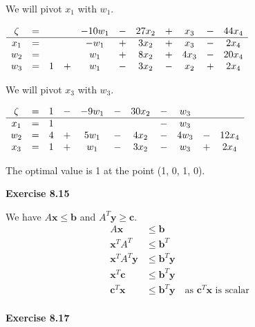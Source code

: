 \documentclass[letterpaper,12pt]{article}
\newcommand{\vect}[1]{\mathbf{#1}}
\begin{document}
We will pivot $x_1$ with $w_1$.

\begin{center}
	$\begin{array}{ c c c c c c c c c c c c}
	\zeta & = & & & -10w_1 & - & 27x_2 & + & x_3 & - & 44x_4 \\
	\hline
	x_1 & = &  & & -w_1 & + & 3x_2 & + & x_3 & - & 2x_4 \\
	w_2 & = &  & & w_1 & + & 8x_2 & + & 4x_3 & - & 20x_4 \\
	w_3 & = & 1 & + & w_1 & - & 3x_2 & - & x_2 & + & 2x_4 \\
	\end{array}$ \\
\end{center}

We will pivot $x_3$ with $w_3$.

\begin{center}
	$\begin{array}{ c c c c c c c c c c c c}
	\zeta & = & 1 & - & -9w_1 & - & 30x_2 & - & w_3 & & \\
	\hline
	x_1 & = & 1 & & & & & - & w_3 & & \\
	w_2 & = & 4 & + & 5w_1 & - & 4x_2 & - & 4w_3 & - & 12x_4 \\
	x_3 & = & 1 & + & w_1 & - & 3x_2 & - & w_3 & + & 2x_4 \\
	\end{array}$ \\
\end{center}

The optimal value is 1 at the point (1, 0, 1, 0).

\textbf{Exercise 8.15}

We have $A \vect{x} \leq \vect{b}$ and $A^T \vect{y} \geq \vect{c}$.
\begin{align*}
A \vect{x} &\leq \vect{b} \\
\vect{x}^T A^T &\leq \vect{b}^T \\
\vect{x}^T A^T \vect{y} &\leq \vect{b}^T \vect{y} \\
\vect{x}^T \vect{c} &\leq \vect{b}^T \vect{y} \\
\vect{c}^T \vect{x} &\leq \vect{b}^T \vect{y} \quad \text{as } {\vect{c}^T \vect{x}} \text{ is scalar}\\
\end{align*}

\textbf{Exercise 8.17}
\end{document}
